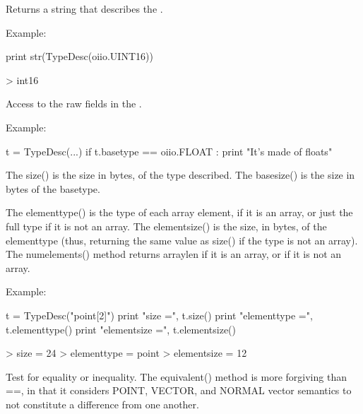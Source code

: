 Returns a string that describes the \TypeDesc.

\noindent Example:
\begin{code}
    print str(TypeDesc(oiio.UINT16))

    > int16
\end{code}
\apiend

Access to the raw fields in the \TypeDesc.

\noindent Example:
\begin{code}
    t = TypeDesc(...)
    if t.basetype == oiio.FLOAT :
        print "It's made of floats"
\end{code}
\apiend

The {\cf size()} is the size in bytes, of the type described.  The
{\cf basesize()} is the size in bytes of the {\cf basetype}.

The {\cf elementtype()} is the type of each array element, if it is an
array, or just the full type if it is not an array.  The {\cf elementsize()}
is the size, in bytes, of the {\cf elementtype} (thus, returning the same
value as {\cf size()} if the type is not an array).  The {\cf numelements()}
method returns {\cf arraylen} if it is an array, or {} if it is not
an array.

\noindent Example:
\begin{code}
    t = TypeDesc("point[2]")
    print "size =", t.size()
    print "elementtype =", t.elementtype()
    print "elementsize =", t.elementsize()

    > size = 24
    > elementtype = point
    > elementsize = 12
\end{code}
\apiend

Test for equality or inequality.  The {\cf equivalent()} method is more
forgiving than {\cf ==}, in that it considers {\cf POINT}, {\cf VECTOR},
and {\cf NORMAL} vector semantics to not constitute a difference from one
another.

